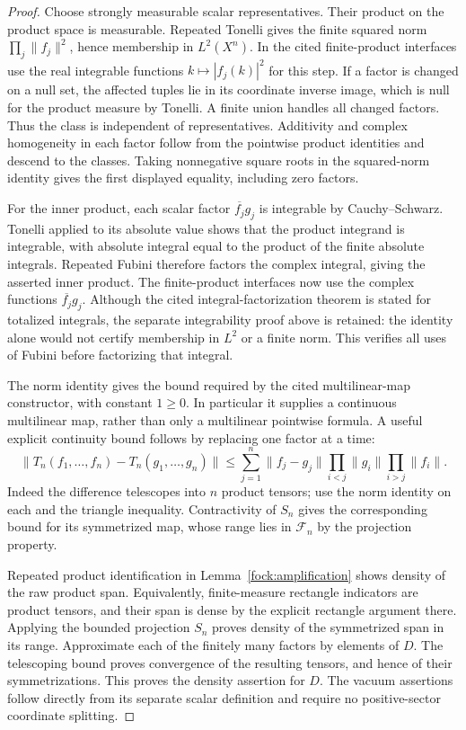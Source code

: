 \documentclass[11pt,a4paper]{article}
\theoremstyle{definition}
\theoremstyle{remark}
\begin{document}
\begin{proof}
Choose strongly measurable scalar representatives. Their product
on the product space is measurable. Repeated Tonelli gives the
finite squared norm $\prod_j\|f_j\|^2$, hence membership in
$L^2(X^n)$. In the cited finite-product interfaces use the real
integrable functions $k\mapsto|f_j(k)|^2$ for this step.
If a factor is changed on a null set, the affected
tuples lie in its coordinate inverse image, which is null for
the product measure by Tonelli. A finite union handles all
changed factors. Thus the class is independent of representatives.
Additivity and complex homogeneity in each factor follow from the
pointwise product identities and descend to the classes. Taking
nonnegative square roots in the squared-norm identity gives the
first displayed equality, including zero factors.

For the inner product, each scalar factor $\overline{f_j}g_j$ is
integrable by Cauchy--Schwarz. Tonelli applied to its absolute value
shows that the product integrand is integrable, with absolute
integral equal to the product of the finite absolute integrals.
Repeated Fubini therefore factors the complex integral, giving
the asserted inner product. The finite-product interfaces now use
the complex functions $\overline{f_j}g_j$. Although the cited
integral-factorization theorem is stated for totalized integrals,
the separate integrability proof above is retained: the identity
alone would not certify membership in $L^2$ or a finite norm.
This verifies all uses of Fubini before factorizing that integral.

The norm identity gives the bound required by the cited
multilinear-map constructor, with constant $1\geq0$. In particular
it supplies a continuous multilinear map, rather than only a
multilinear pointwise formula. A useful explicit continuity bound
follows by replacing one factor at a time:
\[
 \|T_n(f_1,\ldots,f_n)-T_n(g_1,\ldots,g_n)\|
 \leq\sum_{j=1}^n\|f_j-g_j\|
            \prod_{i<j}\|g_i\|\prod_{i>j}\|f_i\|.
\]
Indeed the difference telescopes into $n$ product tensors; use
the norm identity on each and the triangle inequality. Contractivity
of $S_n$ gives the corresponding bound for its symmetrized map,
whose range lies in $\mathcal F_n$ by the projection property.

Repeated product identification in Lemma~\ref{fock:amplification}
shows density of the raw product span. Equivalently,
finite-measure rectangle indicators are product tensors, and
their span is dense by the explicit rectangle argument there.
Applying the bounded projection $S_n$ proves density of the
symmetrized span in its range. Approximate each of the finitely
many factors by elements of $D$. The telescoping bound proves
convergence of the resulting tensors, and hence of their
symmetrizations. This proves the density assertion for $D$.
The vacuum assertions follow directly from its separate scalar
definition and require no positive-sector coordinate splitting.
\end{proof}
\end{document}
